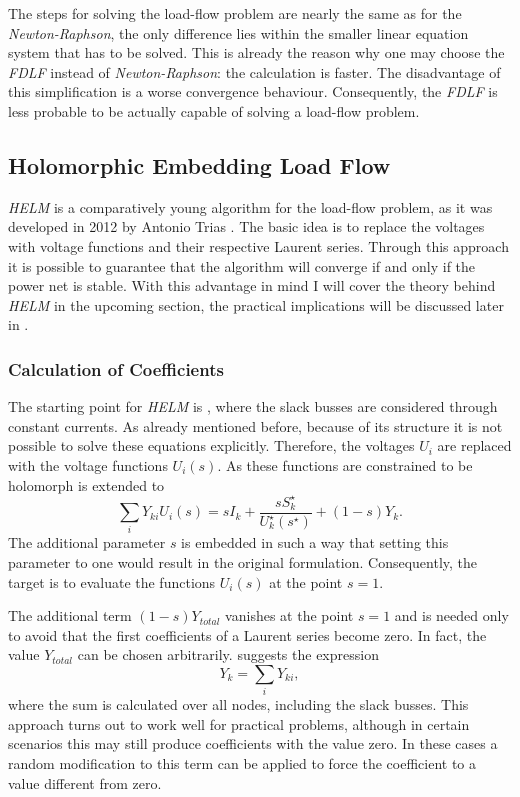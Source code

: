 The steps for solving the load-flow problem are nearly the same as for the \emph{Newton-Raphson}, the only difference lies within the smaller linear equation system that has to be solved. This is already the reason why one may choose the \emph{FDLF} instead of \emph{Newton-Raphson}: the calculation is faster. The disadvantage of this simplification is a worse convergence behaviour. Consequently, the \emph{FDLF} is less probable to be actually capable of solving a load-flow problem.

\subsection{Holomorphic Embedding Load Flow}
\label{sec:helm}

\emph{HELM} is a comparatively young algorithm for the load-flow problem, as it was developed in 2012 by Antonio Trias \citep{helmIEEE}. The basic idea is to replace the voltages with voltage functions and their respective Laurent series. Through this approach it is possible to guarantee that the algorithm will converge if and only if the power net is stable. With this advantage in mind I will cover the theory behind  \emph{HELM} in the upcoming section, the practical implications will be discussed later in .

\subsubsection{Calculation of Coefficients}

The starting point for \emph{HELM} is , where the slack busses are considered through constant currents. As already mentioned before, because of its structure it is not possible to solve these equations explicitly. Therefore, the voltages $U_i$ are replaced with the voltage functions $U_i(s)$. As these functions are constrained to be holomorph \citep{helmPatentSept2009}  is extended to
\begin{equation}	
		\sum_i Y_{ki} U_{i}(s) = s I_k + \frac{s S_k^\star}{U_k^\star(s^\star)} + (1 - s) Y_k.
		\label{eq:pq_bus_embedded}
\end{equation}
The additional parameter $s$ is embedded in such a way that setting this parameter to one would result in the original formulation. Consequently, the target is to evaluate the functions $U_i(s)$ at the point $s = 1$.

The additional term $(1 - s) Y_{total}$ vanishes at the point $s = 1$ and is needed only to avoid that the first coefficients of a Laurent series become zero. In fact, the value $Y_{total}$ can be chosen arbitrarily. \citep{helmPatentSept2009} suggests the expression
\begin{equation}
	Y_k = \sum_i Y_{ki},
\end{equation}
where the sum is calculated over all nodes, including the slack busses. This approach turns out to work well for practical problems, although in certain scenarios this may still produce coefficients with the value zero. In these cases a random modification to this term can be applied to force the coefficient to a value different from zero.

